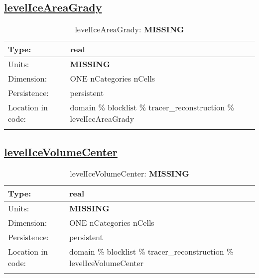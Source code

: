 \subsection[levelIceAreaGrady]{\hyperref[sec:var_tab_tracer_reconstruction]{levelIceAreaGrady}}
\label{subsec:var_sec_tracer_reconstruction_levelIceAreaGrady}
\begin{center}
\begin{longtable}{| p{2.0in} | p{4.0in} |}
        \hline 
        Type: & real \\
        \hline 
        Units: & {\bf \color{red} MISSING} \\
        \hline 
        Dimension: & ONE nCategories nCells \\
        \hline 
        Persistence: & persistent \\
        \hline 
         Location in code: & domain \% blocklist \% tracer\_reconstruction \% levelIceAreaGrady \\
         \hline 
    \caption{levelIceAreaGrady: {\bf \color{red} MISSING}}
\end{longtable}
\end{center}
\subsection[levelIceVolumeCenter]{\hyperref[sec:var_tab_tracer_reconstruction]{levelIceVolumeCenter}}
\label{subsec:var_sec_tracer_reconstruction_levelIceVolumeCenter}
\begin{center}
\begin{longtable}{| p{2.0in} | p{4.0in} |}
        \hline 
        Type: & real \\
        \hline 
        Units: & {\bf \color{red} MISSING} \\
        \hline 
        Dimension: & ONE nCategories nCells \\
        \hline 
        Persistence: & persistent \\
        \hline 
         Location in code: & domain \% blocklist \% tracer\_reconstruction \% levelIceVolumeCenter \\
         \hline 
    \caption{levelIceVolumeCenter: {\bf \color{red} MISSING}}
\end{longtable}
\end{center}
